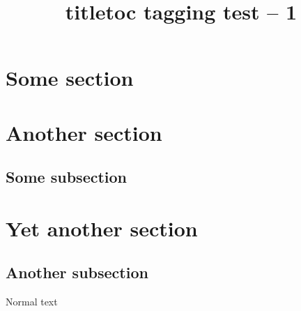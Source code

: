 \documentclass{article}
\title{titletoc tagging test -- 1}
\begin{document}
\tableofcontents %
\section{Some section}
\section{Another section}
\subsection{Some subsection}
\section{Yet another section}
\subsection{Another subsection}
Normal text
\end{document}
